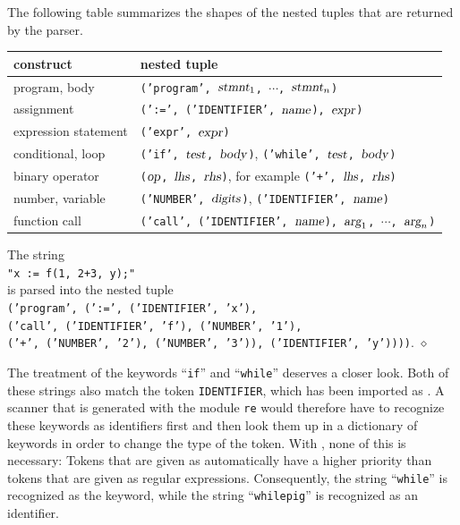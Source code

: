 \noindent
The following table summarizes the shapes of the nested tuples that are returned by the parser.
\begin{center}
\begin{tabular}{|l|l|}
\hline
\textbf{construct}     & \textbf{nested tuple} \\
\hline
program, body          & \texttt{('program', $\textsl{stmnt}_1$, $\cdots$, $\textsl{stmnt}_n$)} \\
assignment             & \texttt{(':=', ('IDENTIFIER', $\textsl{name}$), $\textsl{expr}$)} \\
expression statement   & \texttt{('expr', $\textsl{expr}$)} \\
conditional, loop      & \texttt{('if', $\textsl{test}$, $\textsl{body}$)}, \texttt{('while', $\textsl{test}$, $\textsl{body}$)} \\
binary operator        & \texttt{($\textsl{op}$, $\textsl{lhs}$, $\textsl{rhs}$)}, for example \texttt{('+', $\textsl{lhs}$, $\textsl{rhs}$)} \\
number, variable       & \texttt{('NUMBER', $\textsl{digits}$)}, \texttt{('IDENTIFIER', $\textsl{name}$)} \\
function call          & \texttt{('call', ('IDENTIFIER', $\textsl{name}$), $\textsl{arg}_1$, $\cdots$, $\textsl{arg}_n$)} \\
\hline
\end{tabular}
\end{center}

\exampleEng
The string
\\[0.2cm]
\hspace*{1.3cm}
\texttt{"x := f(1, 2+3, y);"}
\\[0.2cm]
is parsed into the nested tuple
\\[0.2cm]
\hspace*{0.3cm}
\texttt{('program', (':=', ('IDENTIFIER', 'x'),}
\\
\hspace*{0.8cm}
\texttt{('call', ('IDENTIFIER', 'f'), ('NUMBER', '1'),}
\\
\hspace*{1.3cm}
\texttt{('+', ('NUMBER', '2'), ('NUMBER', '3')), ('IDENTIFIER', 'y'))))}.
\hspace*{\fill} $\diamond$

\remarkEng
The treatment of the keywords ``\texttt{if}'' and ``\texttt{while}'' deserves a closer look.  Both of these
strings also match the token \texttt{IDENTIFIER}, which has been imported as .  A
scanner that is generated with the module \texttt{re} would therefore have to recognize these keywords as
identifiers first and then look them up in a dictionary of keywords in order to change the type of the
token.  With , none of this is necessary:  Tokens that are given as 
automatically have a higher priority than tokens that are given as regular expressions.  Consequently, the
string ``\texttt{while}'' is recognized as the keyword, while the string ``\texttt{whilepig}'' is
recognized as an identifier.  \eox

